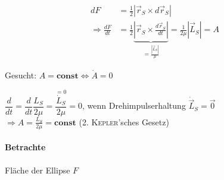 \begin{align*}
    dF &= \frac{1}{2} | \vec r_S \times d \vec r_S | \tag*{$| \cdot dt$} \\
    \Rightarrow \frac{dF}{dt} &= \frac{1}{2} \underbrace{\left| \vec r_S \times \frac{d\vec r_S}{dt}\right|}_{= \frac{|\vec L_S|}{\mu}} = \frac{1}{2\mu} | \vec L_S | = A
\end{align*}

Gesucht: $A = \mathbf{const} \Leftrightarrow \dot A = 0$
\begin{center}
    $\dfrac{d}{dt} = \dfrac{d}{dt} \dfrac{L_S}{2 \mu} = \dfrac{\overset{= 0}{\dot L_S}}{2 \mu} = 0$, wenn Drehimpulserhaltung $\dot{\vec{L}}_S = \vec 0$ \\
    $\Rightarrow \boxed{A = \frac{L_S}{2\mu} = \mathbf{const}}$ (2. \textsc{Kepler}'sches Gesetz)
\end{center}

\paragraph{Betrachte} Fläche der Ellipse $F$

